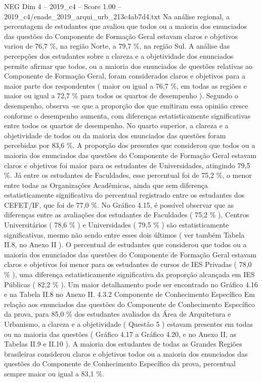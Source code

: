 \begin{textsample}{NEG Dim 4 – 2019\_c4 – Score 1.00 – 2019\_c4/enade\_2019\_arqui\_urb\_213c4ab7d4.txt}
Na análise regional, a percentagem de estudantes que avaliou que todos ou a maioria dos enunciados das questões do Componente de Formação Geral estavam claros e objetivos variou de 76,7 \%, na região Norte, a 79,7 \%, na região Sul.
A análise das percepções dos estudantes sobre a clareza e a objetividade dos enunciados permite afirmar que todos, ou a maioria dos enunciados de questões relativas ao Componente de Formação Geral, foram considerados claros e objetivos para a maior parte dos respondentes ( maior ou igual a 76,7 \%, em todas as regiões e maior ou igual a 72,7 \% para todos os quartos de desempenho ).
Segundo o desempenho, observa -se que a proporção dos que emitiram essa opinião cresce conforme o desempenho aumenta, com diferenças estatisticamente significativas entre todos os quartos de desempenho.
No quarto superior, a clareza e a objetividade de todos ou da maioria dos enunciados das questões foram percebidas por 83,6 \%.
A proporção dos presentes que considerou que todos ou a maioria dos enunciados das questões do Componente de Formação Geral estavam claros e objetivos foi maior para os estudantes de Universidades, atingindo 79,5 \%.
Já entre os estudantes de Faculdades, esse percentual foi de 75,2 \%, o menor entre todas as Organizações Acadêmicas, ainda que sem diferença estatisticamente significativa do percentual registrado entre os estudantes dos CEFET/IF, que foi de 77,0 \%.
No Gráfico 4.15, é possível observar que as diferenças entre as avaliações dos estudantes de Faculdades ( 75,2 \% ), Centros Universitários ( 78,6 \% ) e Universidades ( 79,5 \% ) são estatisticamente significativas, mesmo não sendo entre esses dois últimos ( ver também Tabela II.8, no Anexo II ).
O percentual de estudantes que considerou que todos ou a maioria dos enunciados das questões do Componente de Formação Geral estavam claros e objetivos foi menor para os estudantes de cursos de IES Privadas ( 78,0 \% ), uma diferença estatisticamente significativa da proporção alcançada em IES Públicas ( 82,2 \% ).
Um maior detalhamento pode ser encontrado no Gráfico 4.16 e na Tabela II.8 no Anexo II. 4.3.2 Componente de Conhecimento Específico Em relação aos enunciados das questões do Componente de Conhecimento Específico da prova, para 85,0 \% dos estudantes avaliados da Área de Arquitetura e Urbanismo, a clareza e a objetividade ( Questão 5 ) estavam presentes em todas ou na maioria das questões ( Gráfico 4.17 a Gráfico 4.20, e no Anexo II, as Tabelas II.9 e II.10 ).
A maioria dos estudantes de todas as Grandes Regiões brasileiras considerou claros e objetivos todos ou a maioria dos enunciados das questões do Componente de Conhecimento Específico da prova, percentual sempre maior ou igual a 83,1 \%.

\end{textsample}
